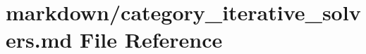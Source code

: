 \hypertarget{category__iterative__solvers_8md}{}\section{markdown/category\+\_\+iterative\+\_\+solvers.md File Reference}
\label{category__iterative__solvers_8md}
